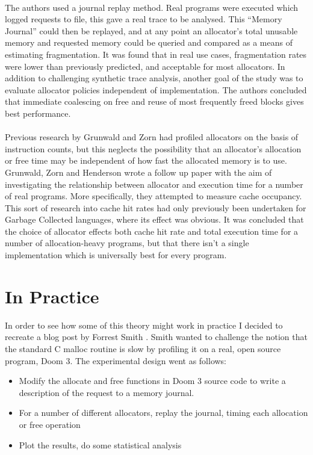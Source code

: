\documentclass{article}
\begin{document}
\\
The authors used a journal replay method. Real programs were executed which logged requests to file, this gave a real trace to be analysed. This ``Memory Journal'' could then be replayed, and at any point an allocator's total unusable memory and requested memory could be queried and compared as a means of estimating fragmentation. It was found that in real use cases, fragmentation rates were lower than previously predicted, and acceptable for most allocators. In addition to challenging synthetic trace analysis, another goal of the study was to evaluate allocator policies independent of implementation. The authors concluded that immediate coalescing on free and reuse of most frequently freed blocks gives best performance.\\
\\
Previous research by Grunwald and Zorn had profiled allocators on the basis of instruction counts, but this neglects the possibility that an allocator's allocation or free time may be independent of how fast the allocated memory is to use. Grunwald, Zorn and Henderson wrote a follow up paper \cite{10.1145/173262.155107} with the aim of investigating the relationship between allocator and execution time for a number of real programs. More specifically, they attempted to measure cache occupancy. This sort of research into cache hit rates had only previously been undertaken for Garbage Collected languages, where its effect was obvious. It was concluded that the choice of allocator effects both cache hit rate and total execution time for a number of allocation-heavy programs, but that there isn't a single implementation which is universally best for every program.

\section{In Practice}
In order to see how some of this theory might work in practice I decided to recreate a blog post by Forrest Smith \cite{doom3-malloc}. Smith wanted to challenge the notion that the standard C malloc routine is slow by profiling it on a real, open source program, Doom 3. The experimental design went as follows:\\
\begin{itemize}
	\item Modify the allocate and free functions in Doom 3 source code to write a description of the request to a memory journal.
	\item For a number of different allocators, replay the journal, timing each allocation or free operation
	\item Plot the results, do some statistical analysis
\end{itemize}
\end{document}
